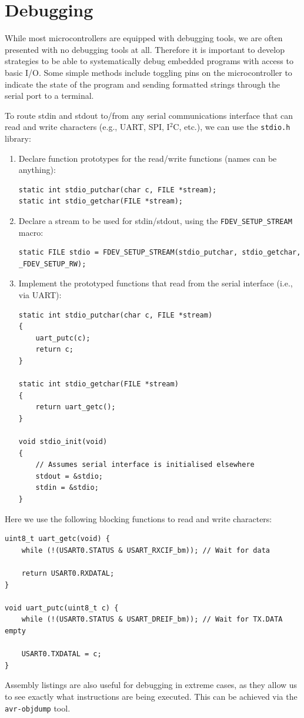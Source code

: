 \documentclass{report}
\begin{document}
\section{Debugging}
While most microcontrollers are equipped with debugging tools, we are often presented with
no debugging tools at all. Therefore it is important to develop strategies to be able to
systematically debug embedded programs with access to basic I/O.
Some simple methods include toggling pins on the microcontroller to indicate the state of the program
and sending formatted strings through the serial port to a terminal.

To route stdin and stdout to/from any serial communications interface that can read and write characters
(e.g., UART, SPI, I\({}^2\)C, etc.), we can use the \texttt{stdio.h} library:
\begin{enumerate}
    \item Declare function prototypes for the read/write functions (names can be anything):
    \begin{verbatim}
static int stdio_putchar(char c, FILE *stream);
static int stdio_getchar(FILE *stream);
    \end{verbatim}
    \item Declare a stream to be used for stdin/stdout, using the \texttt{FDEV_SETUP_STREAM} macro:
    \begin{verbatim}
static FILE stdio = FDEV_SETUP_STREAM(stdio_putchar, stdio_getchar, _FDEV_SETUP_RW);
    \end{verbatim}
    \item Implement the prototyped functions that read from the serial interface (i.e., via UART):
    \begin{verbatim}
static int stdio_putchar(char c, FILE *stream)
{
    uart_putc(c);
    return c;
}

static int stdio_getchar(FILE *stream)
{
    return uart_getc();
}

void stdio_init(void)
{
    // Assumes serial interface is initialised elsewhere
    stdout = &stdio;
    stdin = &stdio;
}
    \end{verbatim}
\end{enumerate}
Here we use the following blocking functions to read and write characters:
\begin{verbatim}
uint8_t uart_getc(void) {
    while (!(USART0.STATUS & USART_RXCIF_bm)); // Wait for data

    return USART0.RXDATAL;
}

void uart_putc(uint8_t c) {
    while (!(USART0.STATUS & USART_DREIF_bm)); // Wait for TX.DATA empty

    USART0.TXDATAL = c;
}
\end{verbatim}
Assembly listings are also useful for debugging in extreme cases, as they
allow us to see exactly what instructions are being executed. This can be achieved via the
\texttt{avr-objdump} tool.
\end{document}
